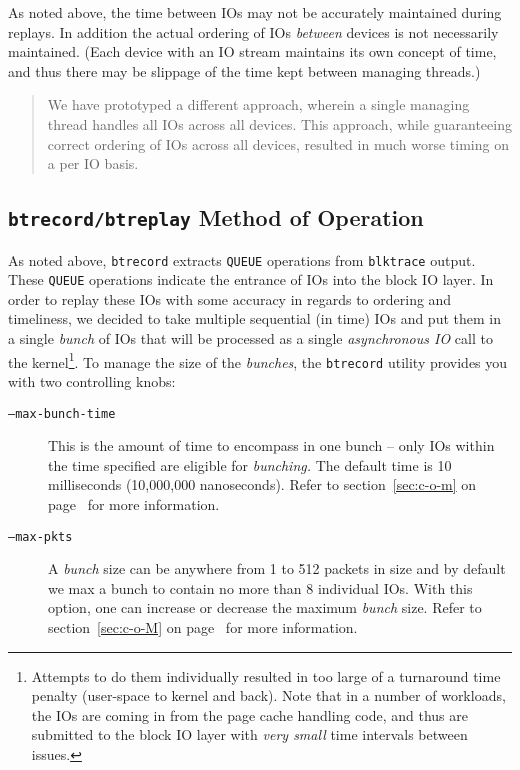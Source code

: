 \documentclass{article}
\begin{document}
  As noted above, the time between IOs may not be accurately maintained
  during replays. In addition the actual ordering of IOs \emph{between}
  devices is not necessarily maintained. (Each device with an IO stream
  maintains its own concept of time, and thus there may be slippage of the
  time kept between managing threads.)

  \begin{quotation}
    We have prototyped a different approach, wherein a single managing
    thread handles all IOs across all devices. This approach, while
    guaranteeing correct ordering of IOs across all devices, resulted in
    much worse timing on a per IO basis. 
  \end{quotation}

\subsection{\texttt{btrecord/btreplay} Method of Operation}

As noted above, \texttt{btrecord} extracts \texttt{QUEUE} operations from
\texttt{blktrace} output. These \texttt{QUEUE} operations indicate the
entrance of IOs into the block IO layer. In order to replay these IOs with
some accuracy in regards to ordering and timeliness, we decided to take
multiple sequential (in time) IOs and put them in a single \emph{bunch} of
IOs that will be processed as a single \emph{asynchronous IO} call to the
kernel\footnote{Attempts to do them individually resulted in too large of a
turnaround time penalty (user-space to kernel and back). Note that in a
number of workloads, the IOs are coming in from the page cache handling
code, and thus are submitted to the block IO layer with \emph{very small}
time intervals between issues.}. To manage the size of the \emph{bunches},
the \texttt{btrecord} utility provides you with two controlling knobs:

\begin{description}
  \item[\texttt{--max-bunch-time}] This is the amount of time to encompass
  in one bunch -- only IOs within the time specified are eligible
  for \emph{bunching.} The default time is 10 milliseconds (10,000,000
  nanoseconds). Refer to section~\ref{sec:c-o-m} on page~\pageref{sec:c-o-m}
  for more information.

  \item[\texttt{--max-pkts}] A \emph{bunch} size can be anywhere from
  1 to 512 packets in size and by default we max a bunch to contain no
  more than 8 individual IOs. With this option, one can increase or
  decrease the maximum \emph{bunch} size.  Refer to section~\ref{sec:c-o-M}
  on page~\pageref{sec:c-o-M} for more information.
\end{description}
\end{document}
